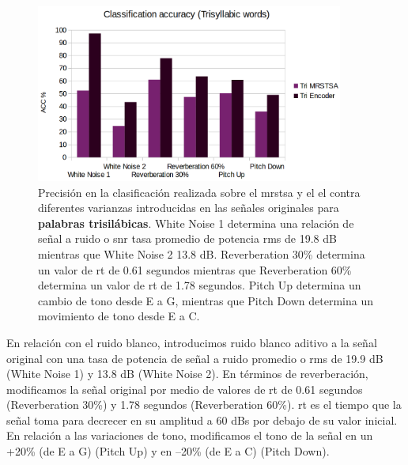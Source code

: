 \begin{figure}[h!]
    \centering
    \includegraphics[width=0.9\textwidth]{TRI_ACC.png}
    \caption{Precisión en la clasificación realizada sobre el \gls{mrstsa} y el \gls{el} contra diferentes varianzas introducidas en las señales originales
    para \textbf{palabras trisilábicas}.
    White Noise 1 determina una relación de señal a ruido o \gls{snr} tasa promedio de potencia \gls{rms} de 19.8 dB mientras que White Noise 2 13.8 dB.
    Reverberation 30\% determina un valor de \gls{rt} de 0.61 segundos mientras que Reverberation 60\% determina un valor de \gls{rt} de 1.78 segundos.
    Pitch Up determina un cambio de tono desde E a G, mientras que Pitch Down determina un movimiento de tono desde E a C.}
    \label{fig:TRI_ACC}
\end{figure}

\pagebreak

En relación con el ruido blanco, introducimos ruido blanco aditivo a la señal original con una tasa de potencia de señal a ruido promedio o \gls{rms} de 19.9 dB (White Noise 1) y 13.8 dB (White Noise 2). En términos de reverberación, modificamos la señal original por medio de valores de \gls{rt} de 0.61 segundos (Reverberation 30\%) y 1.78 segundos (Reverberation 60\%). \gls{rt} es el tiempo que la señal toma para decrecer en su amplitud a 60 dBs por debajo de su valor inicial. En relación a las variaciones de tono, modificamos el tono de la señal en un +20\% (de E a G) (Pitch Up) y en --20\% (de E a C) (Pitch Down).

